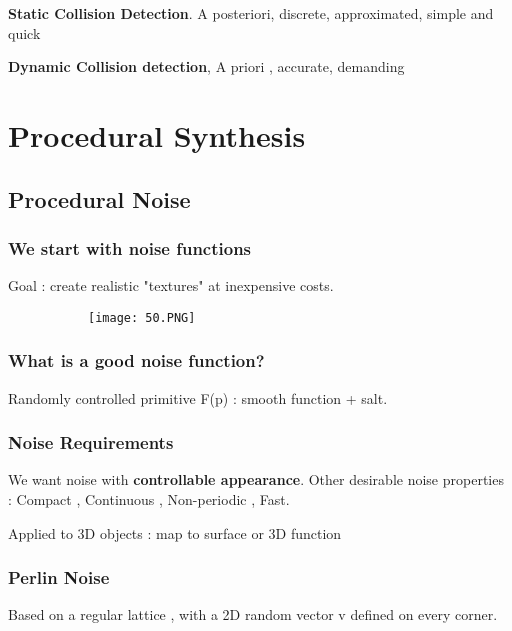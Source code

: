 \documentclass{article}
\begin{document}
\textbf{Static Collision Detection}. A posteriori, discrete, approximated, simple and quick

\textbf{Dynamic Collision detection}, A priori , accurate, demanding

\vspace{50mm}

\section{Procedural Synthesis}
\subsection{Procedural Noise}

\subsubsection{We start with noise functions}

Goal : create realistic "textures" at inexpensive costs.

\begin{figure}[ht!]
  \centering
  \begin{subfigure}[b]{0.4\linewidth}
    \texttt{[image: 50.PNG]}
  \end{subfigure}
\end{figure}

\subsubsection{What is a good noise function?}

Randomly controlled primitive F(p) : smooth function + salt.

\subsubsection{Noise Requirements}

We want noise with \textbf{controllable appearance}.
Other desirable noise properties : Compact , Continuous , Non-periodic , Fast.

Applied to 3D objects : map to surface or 3D function

\subsubsection{Perlin Noise}

Based on a regular lattice , with a 2D random vector v defined on every corner.
\end{document}
